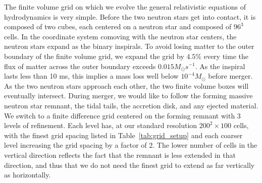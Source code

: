 The finite volume grid on which we evolve the general relativistic equations of hydrodynamics is very simple. Before the two neutron stars get into contact, it is composed of two cubes, each centered on a neutron star and composed of $96^3$ cells.  In the coordinate system comoving with the neutron star centers, the neutron stars expand as the binary inspirals. To avoid losing matter to the outer boundary of the finite volume grid, we expand the grid by $4.5\%$ every time the flux of matter across the outer boundary exceeds $0.015 M_\odot s^{-1}$. As the inspiral lasts less than 10 ms, this implies a mass loss well below $10^{-4} M_\odot$ before merger. As the two neutron stars approach each other, the two finite volume boxes will eventually intersect. During merger, we would like to follow the forming massive neutron star remnant, the tidal tails, the accretion disk, and any ejected material. We switch to a finite difference grid centered on the forming remnant with 3 levels of refinement. Each level has, at our standard resolution $200^2 \times 100$ cells, with the finest grid spacing listed in Table~\ref{tab:grid_setup} and each coarser level increasing the grid spacing by a factor of 2. The lower number of cells in the vertical direction reflects the fact that the remnant is less extended in that direction, and thus that we do not need the finest grid to extend as far vertically as horizontally.



